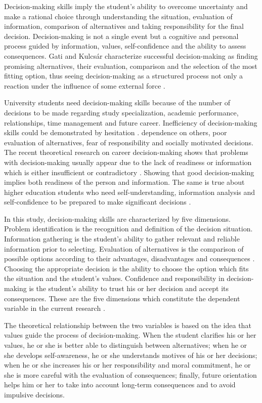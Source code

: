 \documentclass[10pt]{NSP1}
\begin{document}
Decision-making skills imply the student's ability to overcome uncertainty and make a rational choice through understanding the situation, evaluation of information, comparison of alternatives and taking responsibility for the final decision. Decision-making is not a single event but a cognitive and personal process guided by information, values, self-confidence and the ability to assess consequences. \cite{ref15} Gati and Kulcsár characterize successful decision-making as finding promising alternatives, their evaluation, comparison and the selection of the most fitting option, thus seeing decision-making as a structured process not only a reaction under the influence of some external force \cite{ref16}.

University students need decision-making skills because of the number of decisions to be made regarding study specialization, academic performance, relationships, time management and future career. Inefficiency of decision-making skills could be demonstrated by hesitation \cite{ref17}. dependence on others, poor evaluation of alternatives, fear of responsibility and socially motivated decisions. The recent theoretical research on career decision-making shows that problems with decision-making usually appear due to the lack of readiness or information which is either insufficient or contradictory \cite{ref17}. Showing that good decision-making implies both readiness of the person and information. The same is true about higher education students who need self-understanding, information analysis and self-confidence to be prepared to make significant decisions \cite{ref18}.

In this study, decision-making skills are characterized by five dimensions. Problem identification is the recognition and definition of the decision situation. Information gathering is the student's ability to gather relevant and reliable information prior to selecting. Evaluation of alternatives is the comparison of possible options according to their advantages, disadvantages and consequences \cite{ref19}. Choosing the appropriate decision is the ability to choose the option which fits the situation and the student's values. Confidence and responsibility in decision-making is the student's ability to trust his or her decision and accept its consequences. These are the five dimensions which constitute the dependent variable in the current research \cite{ref20}.

The theoretical relationship between the two variables is based on the idea that values guide the process of decision-making. When the student clarifies his or her values, he or she is better able to distinguish between alternatives; when he or she develops self-awareness, he or she understands motives of his or her decisions; when he or she increases his or her responsibility and moral commitment, he or she is more careful with the evaluation of consequences; finally, future orientation helps him or her to take into account long-term consequences and to avoid impulsive decisions.
\end{document}
